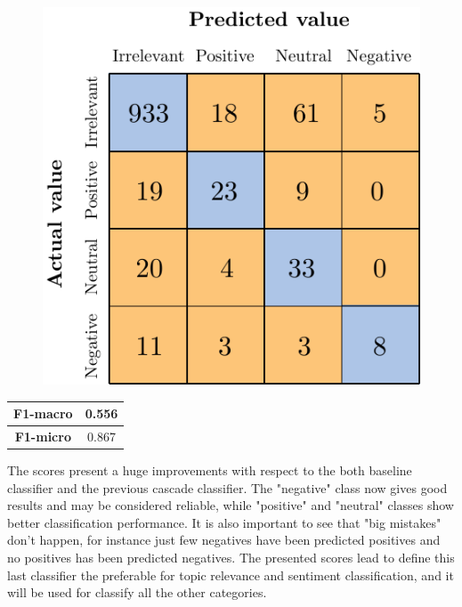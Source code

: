 \begin{figure}[H]
	\centering
	\includegraphics[scale=1]{figures/conf_matrices/ita_cascade_bpef/ita_cascade_bpef_val.pdf}
	\label{fig:ita_cascade_bpef_val}
\end{figure}

\begin{center}
	\begin{tabular}{ | c | c | } 
		\hline
		\textbf{F1-macro} & 0.556 \\
		\hline
		\textbf{F1-micro} & 0.867 \\ 
		\hline
	\end{tabular}
\end{center}

The scores present a huge improvements with respect to the both baseline classifier and the previous cascade classifier. The "negative" class now gives good results and may be considered reliable, while "positive" and "neutral" classes show better classification performance. It is also important to see that "big mistakes" don't happen, for instance just few negatives have been predicted positives and no positives has been predicted negatives. The presented scores lead to define this last classifier the preferable for topic relevance and sentiment classification, and it will be used for classify all the other categories.






